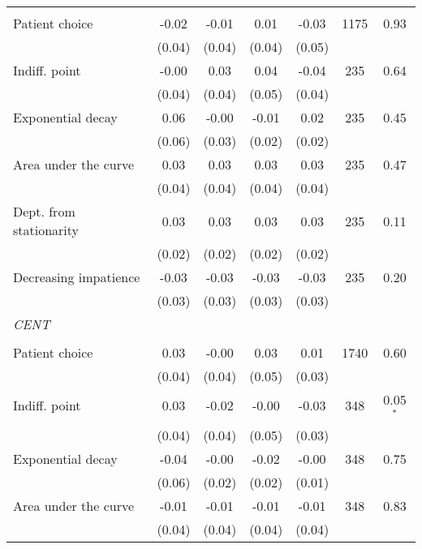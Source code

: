 \begin{table}[htbp]
{\begin{threeparttable}
\begin{tabular}{l*{6}{c}}
          &         &         &         &         &         &         \\
Patient choice&    -0.02&    -0.01&     0.01&    -0.03&     1175&     0.93\\
          &   (0.04)&   (0.04)&   (0.04)&   (0.05)&         &         \\
Indiff. point&    -0.00&     0.03&     0.04&    -0.04&      235&     0.64\\
          &   (0.04)&   (0.04)&   (0.05)&   (0.04)&         &         \\
Exponential decay&     0.06&    -0.00&    -0.01&     0.02&      235&     0.45\\
          &   (0.06)&   (0.03)&   (0.02)&   (0.02)&         &         \\
Area under the curve&     0.03&     0.03&     0.03&     0.03&      235&     0.47\\
          &   (0.04)&   (0.04)&   (0.04)&   (0.04)&         &         \\
Dept. from stationarity&     0.03&     0.03&     0.03&     0.03&      235&     0.11\\
          &   (0.02)&   (0.02)&   (0.02)&   (0.02)&         &         \\
Decreasing impatience&    -0.03&    -0.03&    -0.03&    -0.03&      235&     0.20\\
          &   (0.03)&   (0.03)&   (0.03)&   (0.03)&         &         \\
\textit{CENT}&         &         &         &         &         &         \\
          &         &         &         &         &         &         \\
Patient choice&     0.03&    -0.00&     0.03&     0.01&     1740&     0.60\\
          &   (0.04)&   (0.04)&   (0.05)&   (0.03)&         &         \\
Indiff. point&     0.03&    -0.02&    -0.00&    -0.03&      348&0.05$^{*}$\\
          &   (0.04)&   (0.04)&   (0.05)&   (0.03)&         &         \\
Exponential decay&    -0.04&    -0.00&    -0.02&    -0.00&      348&     0.75\\
          &   (0.06)&   (0.02)&   (0.02)&   (0.01)&         &         \\
Area under the curve&    -0.01&    -0.01&    -0.01&    -0.01&      348&     0.83\\
          &   (0.04)&   (0.04)&   (0.04)&   (0.04)&         &         \\

\end{tabular}
\end{threeparttable}}
\end{table}
